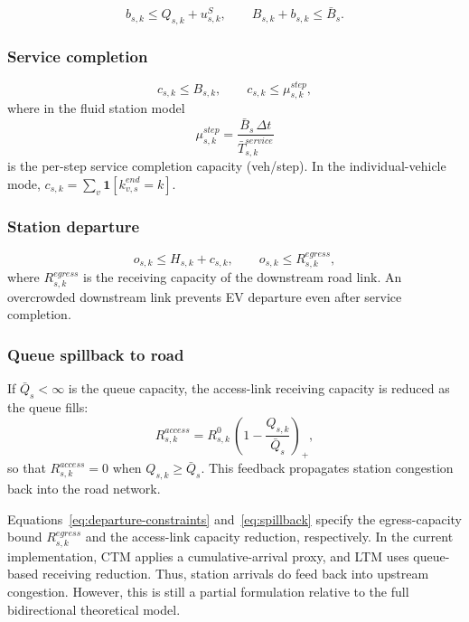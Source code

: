 \begin{equation}
  b_{s,k} \le Q_{s,k} + u^S_{s,k},
  \qquad
  B_{s,k} + b_{s,k} \le \bar{B}_s.
  \label{eq:admission-constraints}
\end{equation}

\subsubsection{Service completion}

\begin{equation}
  c_{s,k} \le B_{s,k}, \qquad c_{s,k} \le \mu^{step}_{s,k},
  \label{eq:completion-constraints}
\end{equation}
where in the fluid station model
\begin{equation}
  \mu^{step}_{s,k}
  = \frac{\bar{B}_s\,\Delta t}{\bar{T}^{service}_{s,k}}
  \label{eq:mu-step}
\end{equation}
is the per-step service completion capacity (veh/step).  In the
individual-vehicle mode, $c_{s,k} = \sum_v \mathbf{1}[k^{end}_{v,s}=k]$.

\subsubsection{Station departure}

\begin{equation}
  o_{s,k} \le H_{s,k} + c_{s,k},
  \qquad
  o_{s,k} \le R^{egress}_{s,k},
  \label{eq:departure-constraints}
\end{equation}
where $R^{egress}_{s,k}$ is the receiving capacity of the downstream
road link.  An overcrowded downstream link prevents EV departure even
after service completion.

\subsubsection{Queue spillback to road}

If $\bar{Q}_s < \infty$ is the queue capacity, the access-link receiving
capacity is reduced as the queue fills:
\begin{equation}
  R^{access}_{s,k}
  = R^0_{s,k}\,\left(1 - \frac{Q_{s,k}}{\bar{Q}_s}\right)_{\!+},
  \label{eq:spillback}
\end{equation}
so that $R^{access}_{s,k} = 0$ when $Q_{s,k} \ge \bar{Q}_s$.
This feedback propagates station congestion back into the road network.

\begin{remark}
  Equations~\eqref{eq:departure-constraints} and~\eqref{eq:spillback}
  specify the egress-capacity bound $R^{egress}_{s,k}$ and the
  access-link capacity reduction, respectively. In the current
  implementation, CTM applies a cumulative-arrival proxy, and LTM uses
  queue-based receiving reduction. Thus, station arrivals do feed back
  into upstream congestion. However, this is still a partial formulation
  relative to the full bidirectional theoretical model.
\end{remark}

